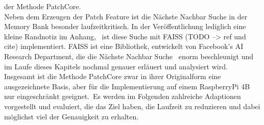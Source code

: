 der Methode PatchCore.\\
Neben dem Erzeugen der Patch Feature ist die Nächste Nachbar Suche in der Memory Bank besonder laufzeitkritisch. In der Veröffentlichung lediglich eine kleine Randnotiz im Anhang, \
ist diese Suche mit \glqq FAISS\grqq{} (TODO --> ref und cite) implementiert. FAISS ist eine Bibliothek, entwickelt von Facebook's AI Research Department, die die Nächste Nachbar Suche \ 
enorm beschleunigt und im Laufe dieses Kapitels nochmal genauer erläuert und analysiert wird.\\
Insgesamt ist die Methode PatchCore zwar in ihrer Originalform eine ausgezeichnete Basis, aber für die Implementierung auf einem RaspberryPi 4B nur eingeschränkt geeignet.\
Es werden im Folgenden zahlreiche Adaptionen vorgestellt und evaluiert, die das Ziel haben, die Laufzeit zu reduzieren und dabei möglichst viel der Genauigkeit zu erhalten.\ 

